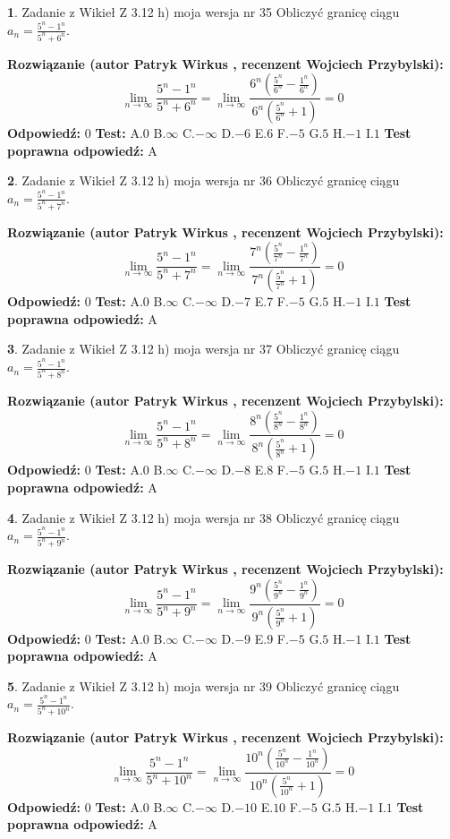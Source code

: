 \documentclass[12pt, a4paper]{article}
\theoremstyle{definition} %
\newtheorem{zad}{}
\newcommand{\zadStart}[1]{\begin{zad}#1\newline}
\newcommand{\zadStop}{\end{zad}}
\newcommand{\rozwStart}[2]{\noindent \textbf{Rozwiązanie (autor #1 , recenzent #2): }\newline}
\newcommand{\rozwStop}{\newline}
\newcommand{\odpStart}{\noindent \textbf{Odpowiedź:}\newline}
\newcommand{\odpStop}{\newline}
\newcommand{\testStart}{\noindent \textbf{Test:}\newline}
\newcommand{\testStop}{\newline}
\newcommand{\kluczStart}{\noindent \textbf{Test poprawna odpowiedź:}\newline}
\newcommand{\kluczStop}{\newline}
\begin{document}
\zadStart{Zadanie z Wikieł Z 3.12 h) moja wersja nr 35}
Obliczyć granicę ciągu $a_{n}=\frac{5^{n} - 1^{n}}{5^{n} + 6^{n}}$.
\zadStop
\rozwStart{Patryk Wirkus}{Wojciech Przybylski}
$$\lim\limits_{n\to\infty}\frac{5^{n} - 1^{n}}{5^{n} + 6^{n}} = \lim\limits_{n\to\infty}\frac{6^{n}(\frac{5^{n}}{6^{n}} - \frac{1^{n}}{6^{n}})}{6^{n}(\frac{5^{n}}{6^{n}} + 1)} = 0$$
\rozwStop
\odpStart
$0$
\odpStop
\testStart
A.$0$
B.$\infty$
C.$-\infty$
D.$-6$
E.$6$
F.$-5$
G.$5$
H.$-1$
I.$1$
\testStop
\kluczStart
A
\kluczStop



\zadStart{Zadanie z Wikieł Z 3.12 h) moja wersja nr 36}
Obliczyć granicę ciągu $a_{n}=\frac{5^{n} - 1^{n}}{5^{n} + 7^{n}}$.
\zadStop
\rozwStart{Patryk Wirkus}{Wojciech Przybylski}
$$\lim\limits_{n\to\infty}\frac{5^{n} - 1^{n}}{5^{n} + 7^{n}} = \lim\limits_{n\to\infty}\frac{7^{n}(\frac{5^{n}}{7^{n}} - \frac{1^{n}}{7^{n}})}{7^{n}(\frac{5^{n}}{7^{n}} + 1)} = 0$$
\rozwStop
\odpStart
$0$
\odpStop
\testStart
A.$0$
B.$\infty$
C.$-\infty$
D.$-7$
E.$7$
F.$-5$
G.$5$
H.$-1$
I.$1$
\testStop
\kluczStart
A
\kluczStop



\zadStart{Zadanie z Wikieł Z 3.12 h) moja wersja nr 37}
Obliczyć granicę ciągu $a_{n}=\frac{5^{n} - 1^{n}}{5^{n} + 8^{n}}$.
\zadStop
\rozwStart{Patryk Wirkus}{Wojciech Przybylski}
$$\lim\limits_{n\to\infty}\frac{5^{n} - 1^{n}}{5^{n} + 8^{n}} = \lim\limits_{n\to\infty}\frac{8^{n}(\frac{5^{n}}{8^{n}} - \frac{1^{n}}{8^{n}})}{8^{n}(\frac{5^{n}}{8^{n}} + 1)} = 0$$
\rozwStop
\odpStart
$0$
\odpStop
\testStart
A.$0$
B.$\infty$
C.$-\infty$
D.$-8$
E.$8$
F.$-5$
G.$5$
H.$-1$
I.$1$
\testStop
\kluczStart
A
\kluczStop



\zadStart{Zadanie z Wikieł Z 3.12 h) moja wersja nr 38}
Obliczyć granicę ciągu $a_{n}=\frac{5^{n} - 1^{n}}{5^{n} + 9^{n}}$.
\zadStop
\rozwStart{Patryk Wirkus}{Wojciech Przybylski}
$$\lim\limits_{n\to\infty}\frac{5^{n} - 1^{n}}{5^{n} + 9^{n}} = \lim\limits_{n\to\infty}\frac{9^{n}(\frac{5^{n}}{9^{n}} - \frac{1^{n}}{9^{n}})}{9^{n}(\frac{5^{n}}{9^{n}} + 1)} = 0$$
\rozwStop
\odpStart
$0$
\odpStop
\testStart
A.$0$
B.$\infty$
C.$-\infty$
D.$-9$
E.$9$
F.$-5$
G.$5$
H.$-1$
I.$1$
\testStop
\kluczStart
A
\kluczStop



\zadStart{Zadanie z Wikieł Z 3.12 h) moja wersja nr 39}
Obliczyć granicę ciągu $a_{n}=\frac{5^{n} - 1^{n}}{5^{n} + 10^{n}}$.
\zadStop
\rozwStart{Patryk Wirkus}{Wojciech Przybylski}
$$\lim\limits_{n\to\infty}\frac{5^{n} - 1^{n}}{5^{n} + 10^{n}} = \lim\limits_{n\to\infty}\frac{10^{n}(\frac{5^{n}}{10^{n}} - \frac{1^{n}}{10^{n}})}{10^{n}(\frac{5^{n}}{10^{n}} + 1)} = 0$$
\rozwStop
\odpStart
$0$
\odpStop
\testStart
A.$0$
B.$\infty$
C.$-\infty$
D.$-10$
E.$10$
F.$-5$
G.$5$
H.$-1$
I.$1$
\testStop
\kluczStart
A
\kluczStop
\end{document}
